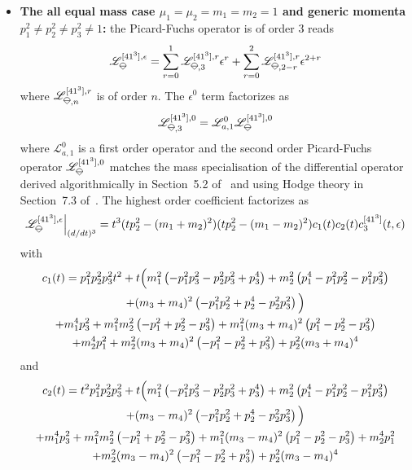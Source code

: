 \documentclass[a4paper,12pt]{article}
\numberwithin{equation}{section}
\numberwithin{figure}{section}
\newcommand{\IceCream}{	\begin{tikzpicture}[scale=0.05]
	\draw[color = black, fill=none] (2,0) arc(0:180:2);
		\draw [black] (-2,0) to (2,0);
		\draw [black] (-2,0) to (0,-2);
                	\draw [black] (2,0) to (0,-2);
	\end{tikzpicture}}
\begin{document}
\begin{itemize}
	
	\item \textbf{ The all equal mass case
		$\mu_1=\mu_2=m_1=m_2=1$ and generic momenta $p_1^2\neq p_2^2\neq
		p_3^2\neq 1$:} the Picard-Fuchs operator is of order 3
	reads
	\begin{equation}
		\mathscr{L}_{\IceCream}^{[41^3],\epsilon}=\sum_{r=0}^1
		\mathscr{L}_{\IceCream,3}^{[41^3],r} \epsilon^r+ \sum_{r=0}^2   \mathscr{L}_{\IceCream,2-r}^{[41^3],r} \epsilon^{2+r}
	\end{equation}
	where $ \mathscr{L}_{\IceCream,n}^{[41^3],r}$  is of order $n$. The
	$\epsilon^0$ term factorizes as
	\begin{equation}
		\mathscr{L}_{\IceCream,3}^{[41^3],0}=\mathscr{L}_{a,1}^0 \mathscr{L}_{\IceCream}^{[41^3],0}      
	\end{equation}
	where $\mathscr{L}_{a,1}^0$ is a first order operator   and the second order
	Picard-Fuchs operator  $\mathscr{L}_{\IceCream}^{[41^3] ,0}
	$ matches the mass specialisation of the differential
	operator derived algorithmically in Section~5.2
	of~\cite{Lairez:2022zkj} and using Hodge theory in
	Section~7.3 of~\cite{Doran:2023yzu}.
	The highest order coefficient factorizes as
	\begin{equation}
		\mathscr{L}_{\IceCream}^{[41^3],\epsilon}\Big|_{(d/dt)^3}=t^3(tp_2^2-(m_1+m_2)^2)(tp_2^2-(m_1-m_2)^2) c_1(t) c_2(t)c^{[41^3]}_3(t,\epsilon)   
	\end{equation}
	with
	\begin{multline}
		c_1(t)=   p_{1}^2 p_{2}^2 p_{3}^2 t^2 +t\Big(m_{1}^2 \left(-p_{1}^2 p_{3}^2-p_{2}^2 p_{3}^2+p_{3}^4\right)+m_{2}^2 \left(p_{1}^4-p_{1}^2
		p_{2}^2-p_{1}^2 p_{3}^2\right)\cr+(m_{3}+m_{4})^2
		\left(-p_{1}^2 p_{2}^2+p_{2}^4-p_{2}^2
		p_{3}^2\right)\Big)\cr
		+m_{1}^4 p_{3}^2+m_{1}^2 m_{2}^2 \left(-p_{1}^2+p_{2}^2-p_{3}^2\right)+m_{1}^2 (m_{3}+m_{4})^2
		\left(p_{1}^2-p_{2}^2-p_{3}^2\right)\cr+m_{2}^4 p_{1}^2+m_{2}^2 (m_{3}+m_{4})^2
		\left(-p_{1}^2-p_{2}^2+p_{3}^2\right)+p_{2}^2 (m_{3}+m_{4})^4
	\end{multline}
	and
	\begin{multline}
		c_2(t)=t^2 p_{1}^2 p_{2}^2 p_{3}^2+t\Big(m_{1}^2 \left(-p_{1}^2 p_{3}^2-p_{2}^2 p_{3}^2+p_{3}^4\right)+m_{2}^2 \left(p_{1}^4-p_{1}^2
		p_{2}^2-p_{1}^2 p_{3}^2\right)\cr+(m_{3}-m_{4})^2 \left(-p_{1}^2 p_{2}^2+p_{2}^4-p_{2}^2 p_{3}^2\right)\Big)\cr
		+m_{1}^4 p_{3}^2+m_{1}^2 m_{2}^2 \left(-p_{1}^2+p_{2}^2-p_{3}^2\right)+m_{1}^2 (m_{3}-m_{4})^2
		\left(p_{1}^2-p_{2}^2-p_{3}^2\right)+m_{2}^4 p_{1}^2\cr+m_{2}^2 (m_{3}-m_{4})^2
		\left(-p_{1}^2-p_{2}^2+p_{3}^2\right)+p_{2}^2 (m_{3}-m_{4})^4

\end{multline}
\end{itemize}
\end{document}
